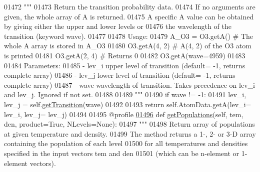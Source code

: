 \begin{DoxyCode}
{{01472         \textcolor{stringliteral}{"""}
01473 \textcolor{stringliteral}{        Return the transition probability data. }
01474 \textcolor{stringliteral}{        If no arguments are given, the whole array of A is returned.}
01475 \textcolor{stringliteral}{        A specific A value can be obtained by giving either the upper and lower levels or }
01476 \textcolor{stringliteral}{            the wavelength of the transition (keyword wave).}
01477 \textcolor{stringliteral}{            }
01478 \textcolor{stringliteral}{        Usage:}
01479 \textcolor{stringliteral}{            A\_O3 = O3.getA()          # The whole A array is stored in A\_O3}
01480 \textcolor{stringliteral}{            O3.getA(4, 2)      # A(4, 2) of the O3 atom is printed}
01481 \textcolor{stringliteral}{            O3.getA(2, 4)      # Returns 0}
01482 \textcolor{stringliteral}{            O3.getA(wave=4959)      }
01483 \textcolor{stringliteral}{}
01484 \textcolor{stringliteral}{        Parameters:}
01485 \textcolor{stringliteral}{            - lev\_i  upper level of transition (default= -1, returns complete array)}
01486 \textcolor{stringliteral}{            - lev\_j  lower level of transition (default= -1, returns complete array)}
01487 \textcolor{stringliteral}{            - wave   wavelength of transition. Takes precedence on lev\_i and lev\_j. Ignored if not set.}
01488 \textcolor{stringliteral}{            }
01489 \textcolor{stringliteral}{        """}
01490         \textcolor{keywordflow}{if} wave != -1:
01491             lev\_i, lev\_j = self.\hyperlink{classpyneb_1_1core_1_1pynebcore_1_1_atom_a7c9f17a3d9e841267add92377d9d1ede}{getTransition}(wave)
01492         
01493         \textcolor{keywordflow}{return} self.AtomData.getA(lev\_i= lev\_i, lev\_j= lev\_j)
01494         
01495     @profile
\hypertarget{pynebcore_8py_source_l01496}{}\hyperlink{classpyneb_1_1core_1_1pynebcore_1_1_atom_aab7496403c8aaef40ab3b20b5c00e9f0}{01496}     \textcolor{keyword}{def }\hyperlink{classpyneb_1_1core_1_1pynebcore_1_1_atom_aab7496403c8aaef40ab3b20b5c00e9f0}{getPopulations}(self, tem, den, product=True, NLevels=None):
01497         \textcolor{stringliteral}{"""}
01498 \textcolor{stringliteral}{        Return array of populations at given temperature and density.}
01499 \textcolor{stringliteral}{        The method returns a 1-, 2- or 3-D array containing the population of each level }
01500 \textcolor{stringliteral}{            for all temperatures and densities specified in the input vectors tem and den }
01501 \textcolor{stringliteral}{            (which can be n-element or 1-element vectors).}
}}
\end{DoxyCode}
